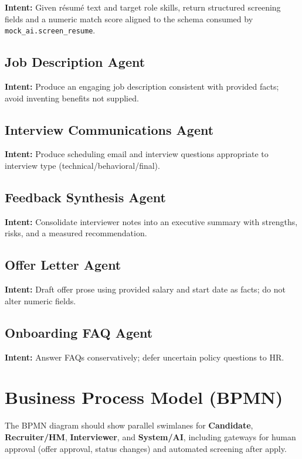 \documentclass[12pt]{article}
\begin{document}
\textbf{Intent:} Given résumé text and target role skills, return structured screening fields and a numeric match score aligned to the schema consumed by \texttt{mock\_ai.screen\_resume}.

\subsection{Job Description Agent}

\textbf{Intent:} Produce an engaging job description consistent with provided facts; avoid inventing benefits not supplied.

\subsection{Interview Communications Agent}

\textbf{Intent:} Produce scheduling email and interview questions appropriate to interview type (technical/behavioral/final).

\subsection{Feedback Synthesis Agent}

\textbf{Intent:} Consolidate interviewer notes into an executive summary with strengths, risks, and a measured recommendation.

\subsection{Offer Letter Agent}

\textbf{Intent:} Draft offer prose using provided salary and start date as facts; do not alter numeric fields.

\subsection{Onboarding FAQ Agent}

\textbf{Intent:} Answer FAQs conservatively; defer uncertain policy questions to HR.

\section{Business Process Model (BPMN)}
\label{sec:bpmn}

The BPMN diagram should show parallel swimlanes for \textbf{Candidate}, \textbf{Recruiter/HM}, \textbf{Interviewer}, and \textbf{System/AI}, including gateways for human approval (offer approval, status changes) and automated screening after apply.
\end{document}
